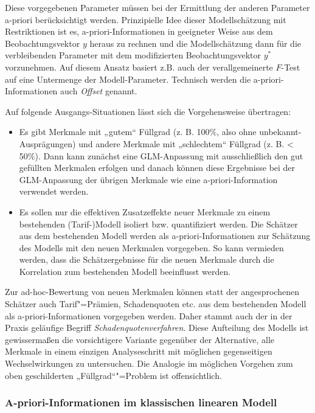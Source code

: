 Diese vorgegebenen Parameter müssen bei der Ermittlung der anderen Parameter a-priori berücksichtigt werden. Prinzipielle Idee dieser Modellschätzung mit Restriktionen ist es, a-priori-Informationen in geeigneter Weise aus dem Beobachtungsvektor $y$  heraus zu rechnen und die Modellschätzung dann für die verbleibenden Parameter mit dem modifizierten Beobachtungsvektor  $y^*$ vorzunehmen. Auf diesem Ansatz basiert z.B. auch der verallgemeinerte  $F$-Test auf eine Untermenge der Modell-Parameter. Technisch werden die a-priori-Informationen auch \textit{Offset} genannt.

Auf folgende Ausgangs-Situationen lässt sich die Vorgehensweise übertragen:
\begin{itemize}
\item Es gibt Merkmale mit „gutem“ Füllgrad (z. B. 100\%, also ohne unbekannt-Ausprägungen) und andere Merkmale mit „schlechtem“ Füllgrad (z. B. < 50\%). Dann kann zunächst eine GLM-Anpassung mit ausschließlich den gut gefüllten Merkmalen erfolgen und danach können diese Ergebnisse bei der GLM-Anpassung der übrigen Merkmale wie eine a-priori-Information verwendet werden.
\item Es sollen nur die effektiven Zusatzeffekte neuer Merkmale zu einem bestehenden (Tarif-)Modell isoliert bzw. quantifiziert werden. Die Schätzer aus dem bestehenden Modell werden als a-priori-Informationen zur Schätzung des Modells mit den neuen Merkmalen vorgegeben. So kann vermieden werden, dass die Schätzergebnisse für die neuen Merkmale durch die Korrelation zum bestehenden Modell beeinflusst werden.
\end{itemize}

Zur ad-hoc-Bewertung von neuen Merkmalen können statt der angesprochenen Schätzer auch Tarif"=Prämien, Schadenquoten etc. aus dem bestehenden Modell als a-priori-Informationen vorgegeben werden. Daher stammt auch der in der Praxis geläufige Begriff \textit{Schadenquotenverfahren}. Diese Aufteilung des Modells ist gewissermaßen die vorsichtigere Variante gegenüber der Alternative, alle Merkmale in einem einzigen Analyseschritt mit möglichen gegenseitigen Wechselwirkungen zu untersuchen. Die Analogie im möglichen Vorgehen zum oben geschilderten „Füllgrad“"=Problem ist offensichtlich.

\subsubsection{A-priori-Informationen im klassischen linearen Modell}


